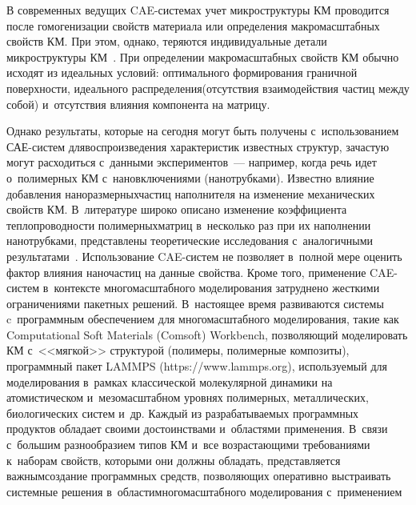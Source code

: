 \begin{multicols}{2}
     В современных ведущих CAE-сис\-те\-мах учет мик\-ро\-струк\-ту\-ры 
КМ проводится после гомогенизации свойств материала 
или определения мак\-ро\-мас\-штаб\-ных свойств КМ. При этом, однако, теряются 
индивидуальные детали микроструктуры КМ~\cite{3-ab}. При определении макромасштабных свойств КМ обычно 
исходят из идеальных условий: оптимального формирования граничной 
поверхности, идеального распределения(отсутствия взаимодействия час\-тиц 
между собой) и~отсутствия влияния компонента на мат\-рицу.
     
     Однако результаты, которые на сегодня могут быть получены 
     с~использованием САЕ-систем для\linebreak воспроизведения характеристик известных 
структур, зачастую могут расходиться с~данными экспериментов~--- например, 
когда речь идет о~полимерных КМ с~на\-но\-вклю\-че\-ни\-ями 
(\mbox{нанотрубками}). \mbox{Известно} влияние до\-бав\-ле\-ния на\-но\-раз\-мер\-ных\linebreak час\-тиц 
наполнителя на изменение механических свойств КМ. 
В~литературе широко описано изменение коэффициента теп\-ло\-про\-вод\-ности 
полимерных\linebreak мат\-риц в~несколько раз при их наполнении 
нанотрубками, пред\-став\-ле\-ны тео\-ре\-ти\-че\-ские исследования с~аналогичными 
результатами~\cite{1-ab}. Использование CAE-сис\-те\-м не позволяет в~полной 
мере \mbox{оценить} фактор влияния на\-но\-час\-тиц на данные свойства. Кроме 
того, применение CAE-сис\-тем в~контексте многомасштабного моделирования 
затруднено жесткими ограничениями пакетных решений. В~настоящее время 
развиваются \mbox{системы} c~программным обеспечением для многомасштабного 
моделирования, такие как Computational Soft Materials (Comsoft) Workbench, 
поз\-во\-ля\-ющий моделировать КМ с~<<мягкой>> 
структурой (полимеры, полимерные композиты), программный пакет LAMMPS 
({\sf https://www.lammps.org}), ис\-поль\-зу\-емый для моделирования в~рамках 
классической молекулярной динамики на атомистическом и~мезомасштабном 
уровнях полимерных, металлических, биологических сис\-тем и~др. Каждый из 
разрабатываемых программных продуктов обладает своими достоинствами 
и~областями применения. В~связи с~большим разнообразием типов 
КМ и~все воз\-рас\-та\-ющи\-ми требованиями к~наборам 
свойств, которыми они должны обладать, пред\-став\-ля\-ет\-ся важ\-ным\linebreak создание 
программных средств, поз\-во\-ля\-ющих оперативно вы\-стра\-и\-вать сис\-тем\-ные 
решения в~об\-ласти\linebreak многомасштабного моделирования с~применением 

\end{multicols}
